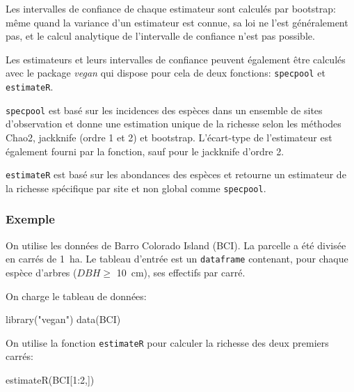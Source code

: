 \documentclass[
  11pt,
  american,
  a4paper,
  extrafontsizes,onecolumn,openright
  ]{memoir}
\newenvironment{Shaded}{\begin{snugshade}}{\end{snugshade}}
\newcommand{\DecValTok}[1]{\textcolor[rgb]{0.00,0.00,0.81}{#1}}
\newcommand{\FunctionTok}[1]{\textcolor[rgb]{0.00,0.00,0.00}{#1}}
\newcommand{\NormalTok}[1]{#1}
\newcommand{\SpecialCharTok}[1]{\textcolor[rgb]{0.00,0.00,0.00}{#1}}
\newcommand{\StringTok}[1]{\textcolor[rgb]{0.31,0.60,0.02}{#1}}
\begin{document}
Les intervalles de confiance de chaque estimateur sont calculés par bootstrap: même quand la variance d'un estimateur est connue, sa loi ne l'est généralement pas, et le calcul analytique de l'intervalle de confiance n'est pas possible.

Les estimateurs et leurs intervalles de confiance peuvent également être calculés avec le package \emph{vegan} qui dispose pour cela de deux fonctions: \texttt{specpool} et \texttt{estimateR}.

\texttt{specpool} est basé sur les incidences des espèces dans un ensemble de sites d'observation et donne une estimation unique de la richesse selon les méthodes Chao2, jackknife (ordre 1 et 2) et bootstrap.
L'écart-type de l'estimateur est également fourni par la fonction, sauf pour le jackknife d'ordre 2.

\texttt{estimateR} est basé sur les abondances des espèces et retourne un estimateur de la richesse spécifique par site et non global comme \texttt{specpool}.

\hypertarget{exemple}{%
\subsubsection{Exemple}\label{exemple}}

On utilise les données de Barro Colorado Island (BCI).
La parcelle a été divisée en carrés de 1~ha.
Le tableau d'entrée est un \texttt{dataframe} contenant, pour chaque espèce d'arbres (\(\mathit{DBH}\ge\) 10~cm), ses effectifs par carré.

On charge le tableau de données:

\scriptsize

\begin{Shaded}
\begin{Highlighting}[]
\FunctionTok{library}\NormalTok{(}\StringTok{"vegan"}\NormalTok{)}
\FunctionTok{data}\NormalTok{(BCI)}
\end{Highlighting}
\end{Shaded}

\normalsize

On utilise la fonction \texttt{estimateR} pour calculer la richesse des deux premiers carrés:

\scriptsize

\begin{Shaded}
\begin{Highlighting}[]
\FunctionTok{estimateR}\NormalTok{(BCI[}\DecValTok{1}\SpecialCharTok{:}\DecValTok{2}\NormalTok{,])}
\end{Highlighting}
\end{Shaded}
\end{document}
